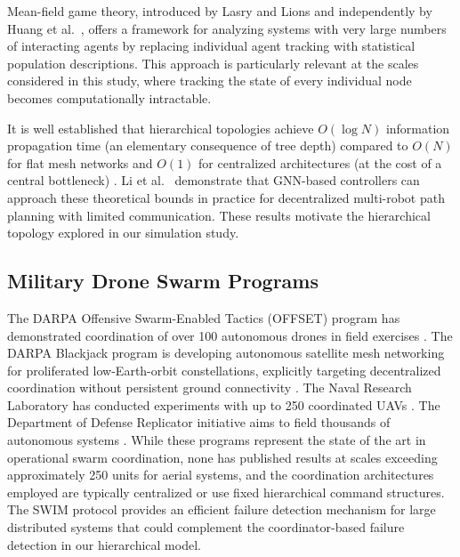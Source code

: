 \documentclass[journal]{IEEEtran}
\begin{document}
Mean-field game theory, introduced by Lasry and Lions \cite{lasry_mfg} and independently by Huang et al.~\cite{huang_mfg}, offers a framework for analyzing systems with very large numbers of interacting agents by replacing individual agent tracking with statistical population descriptions. This approach is particularly relevant at the scales considered in this study, where tracking the state of every individual node becomes computationally intractable.

It is well established that hierarchical topologies achieve $O(\log N)$ information propagation time (an elementary consequence of tree depth) compared to $O(N)$ for flat mesh networks and $O(1)$ for centralized architectures (at the cost of a central bottleneck) \cite{lynch_distributed}. Li et al.~\cite{li_decentralized} demonstrate that GNN-based controllers can approach these theoretical bounds in practice for decentralized multi-robot path planning with limited communication. These results motivate the hierarchical topology explored in our simulation study.

\subsection{Military Drone Swarm Programs}

The DARPA Offensive Swarm-Enabled Tactics (OFFSET) program has demonstrated coordination of over 100 autonomous drones in field exercises \cite{darpa_offset}. The DARPA Blackjack program is developing autonomous satellite mesh networking for proliferated low-Earth-orbit constellations, explicitly targeting decentralized coordination without persistent ground connectivity \cite{darpa_blackjack}. The Naval Research Laboratory has conducted experiments with up to 250 coordinated UAVs \cite{nrl_swarm}. The Department of Defense Replicator initiative aims to field thousands of autonomous systems \cite{dod_replicator}. While these programs represent the state of the art in operational swarm coordination, none has published results at scales exceeding approximately 250 units for aerial systems, and the coordination architectures employed are typically centralized or use fixed hierarchical command structures. The SWIM protocol \cite{das_swim} provides an efficient failure detection mechanism for large distributed systems that could complement the coordinator-based failure detection in our hierarchical model.


\end{document}
